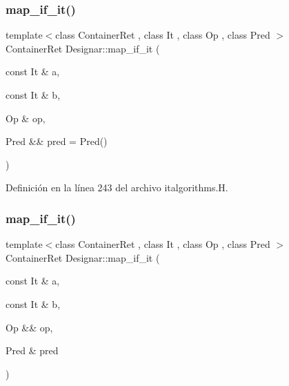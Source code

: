 \mbox{\label{namespace_designar_afebc876d3ceb8615462f21c3ed15eb0c}} 
\subsubsection{\texorpdfstring{map\+\_\+if\+\_\+it()}{map\_if\_it()}\hspace{0.1cm}{\footnotesize\ttfamily [2/4]}}
{\footnotesize\ttfamily template$<$class Container\+Ret , class It , class Op , class Pred $>$ \\
Container\+Ret Designar\+::map\+\_\+if\+\_\+it (\begin{DoxyParamCaption}\item[{const It \&}]{a,  }\item[{const It \&}]{b,  }\item[{Op \&}]{op,  }\item[{Pred \&\&}]{pred = {\ttfamily Pred()} }\end{DoxyParamCaption})}



Definición en la línea 243 del archivo italgorithms.\+H.

\mbox{\label{namespace_designar_a5db9dd044c541c52c021da1e1af12032}} 
\subsubsection{\texorpdfstring{map\+\_\+if\+\_\+it()}{map\_if\_it()}\hspace{0.1cm}{\footnotesize\ttfamily [3/4]}}
{\footnotesize\ttfamily template$<$class Container\+Ret , class It , class Op , class Pred $>$ \\
Container\+Ret Designar\+::map\+\_\+if\+\_\+it (\begin{DoxyParamCaption}\item[{const It \&}]{a,  }\item[{const It \&}]{b,  }\item[{Op \&\&}]{op,  }\item[{Pred \&}]{pred }\end{DoxyParamCaption})}



